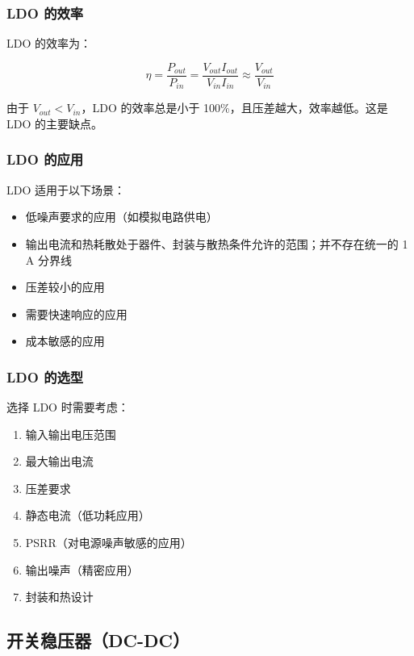 \subsubsection{LDO 的效率}

LDO 的效率为：

\begin{equation}
\eta = \frac{P_{out}}{P_{in}} = \frac{V_{out} I_{out}}{V_{in} I_{in}} \approx \frac{V_{out}}{V_{in}} \label{eq:ldo-efficiency}
\end{equation}

由于 $V_{out} < V_{in}$，LDO 的效率总是小于 100\%，且压差越大，效率越低。这是 LDO 的主要缺点。

\subsubsection{LDO 的应用}

LDO 适用于以下场景：
\begin{itemize}
  \item 低噪声要求的应用（如模拟电路供电）
  \item 输出电流和热耗散处于器件、封装与散热条件允许的范围；并不存在统一的 1 A 分界线
  \item 压差较小的应用
  \item 需要快速响应的应用
  \item 成本敏感的应用
\end{itemize}

\subsubsection{LDO 的选型}

选择 LDO 时需要考虑：
\begin{enumerate}
  \item 输入输出电压范围
  \item 最大输出电流
  \item 压差要求
  \item 静态电流（低功耗应用）
  \item PSRR（对电源噪声敏感的应用）
  \item 输出噪声（精密应用）
  \item 封装和热设计
\end{enumerate}

\subsection{开关稳压器（DC-DC）}

